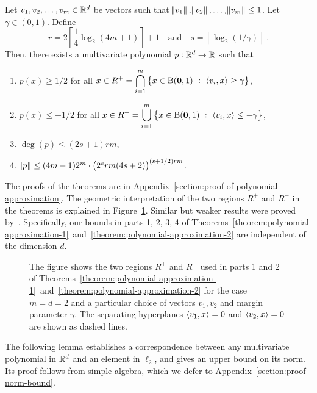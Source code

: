 \begin{theorem}
\label{theorem:polynomial-approximation-2}
Let $v_1, v_2, \dots, v_m \in \mathbb{R}^d$ be vectors such that $\norm{v_1},
\norm{v_2}, \dots, \norm{v_m} \le 1$. Let $\gamma \in (0,1)$.
Define
$$
r = 2 \left\lceil \frac{1}{4} \log_2(4m + 1) \right\rceil + 1 \quad \text{and} \quad s = \left \lceil \log_2(1/\gamma) \right \rceil \; .
$$
Then, there exists a multivariate polynomial $p:\mathbb{R}^d \to \mathbb{R}$ such that
\begin{enumerate}
\item $\displaystyle p(x) \ge 1/2$
for all $\displaystyle x \in R^+ = \bigcap_{i=1}^m \left\{ x \in \operatorname{B}(\mathbf{0},1) ~:~ \left\langle v_i, x \right\rangle \ge \gamma \right\}$,

\item $\displaystyle p(x) \le - 1/2$
for all $\displaystyle x \in R^- = \bigcup_{i=1}^m \left\{ x \in \operatorname{B}(\mathbf{0},1) ~:~ \left\langle v_i, x \right\rangle \le - \gamma \right\}$,

\item $\deg(p) \le (2s+1) rm$,
\item $\norm{p} \le (4m-1) 2^m \cdot \left(2^s rm (4s+2) \right)^{(s+1/2)rm}$.
\end{enumerate}
\end{theorem}

The proofs of the theorems are in
Appendix~\ref{section:proof-of-polynomial-approximation}. The geometric
interpretation of the two regions $R^+$ and $R^-$ in the theorems is explained
in Figure~\ref{figure:pizza-slice}. Similar but weaker results were proved
by~\citet{Klivans-Servedio-2008}. Specifically, our bounds in parts 1, 2, 3, 4
of
Theorems~\ref{theorem:polynomial-approximation-1}~and~\ref{theorem:polynomial-approximation-2}
are independent of the dimension $d$.

\begin{figure}
\begin{center}
 \scalebox{.65}{}
\end{center}
\caption[]{The figure shows the two regions $R^+$ and $R^-$ used in parts 1 and
2 of
Theorems~\ref{theorem:polynomial-approximation-1}~and~\ref{theorem:polynomial-approximation-2}
for the case $m=d=2$ and a particular choice of vectors $v_1, v_2$ and margin
parameter $\gamma$. The separating hyperplanes $\left\langle v_1, x \right\rangle = 0$ and
$\left\langle v_2, x \right\rangle = 0$ are shown as dashed lines.}
\label{figure:pizza-slice}
\end{figure}

The following lemma establishes a correspondence between any multivariate
polynomial in $\mathbb{R}^d$ and an element in $\ell_2$, and gives an upper bound on its
norm. Its proof follows from simple algebra, which we defer to
Appendix~\ref{section:proof-norm-bound}.

